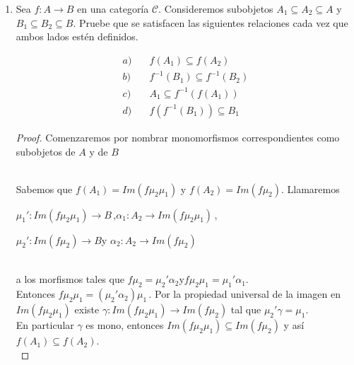 \documentclass{article}
\begin{document}
\begin{enumerate}[label=\textbf{Ej \arabic*.}]
\begin{proof}
Ahora, si existiera $\alpha: X\to f^{-1}(B')$ tal que $\beta_1\alpha=\eta_2$ y $\gamma\alpha=\eta_1$, entonces 
$\nu_2\gamma\alpha=\gamma_2\eta_1$ y por lo anterior $\alpha=\gamma'$ pues es el único con esas propiedades. Por lo tanto 
$f^{-1}(B')$ es un pull-back, del diagrama (1), e implica que $f^{-1}(I\cap B')$ existe y sea igual a $f^{-1}(B)$ con los morfismos
$\gamma$ y $\beta_1$.

\end{proof}

\item Sea $f:A\to B$ en una categoría $\mathscr{C}$. Consideremos subobjetos $A_1\subseteq A_2\subseteq A$ y  $B_1\subseteq B_2\subseteq B$.
Pruebe que se satisfacen las siguientes relaciones cada vez que ambos lados estén definidos.

\begin{align*}
a)&\quad f(A_1)\subseteq f(A_2)\\
b)&\quad f^{-1}(B_1)\subseteq f^{-1}(B_2)\\
c)&\quad A_1\subseteq f^{-1}(f(A_1))\\
d)&\quad f(f^{-1}(B_1))\subseteq B_1
\end{align*}

\begin{proof}

Comenzaremos por nombrar monomorfismos correspondientes como subobjetos de $A$ y de $B$\\
\centerline{
}\\

 Sabemos que $f(A_1)=Im(f\mu_2\mu_1)$ y $f(A_2)=Im(f\mu_2)$. Llamaremos \\

\centerline{
$\mu_1':Im(f\mu_2\mu_1)\to B$\,,\qquad $\alpha_1:A_2\to Im(f\mu_2\mu_1)$\,,}

\centerline{
$\mu_2':Im(f\mu_2)\to B$\quad y \quad $\alpha_2:A_2\to Im(f\mu_2)$
}

\,\\ a los morfismos tales que $f\mu_2=\mu_2'\alpha_2$\quad y\quad $f\mu_2\mu_1=\mu_1'\alpha_1$.\\
Entonces $f\mu_2\mu_1=(\mu_2'\alpha_2)\mu_1\,.$ Por la propiedad universal de la imagen en $Im(f\mu_2\mu_1)$ existe 
$\gamma : Im(f\mu_2\mu_1)\to Im(f\mu_2)$ tal que $\mu_2'\gamma=\mu_1$.\\
 En particular $\gamma$ es mono, entonces $Im(f\mu_2\mu_1)\subseteq Im(f\mu_2)$ y así \\$f(A_1)\subseteq f(A_2)$.\\


\end{proof}
\end{enumerate}
\end{document}
